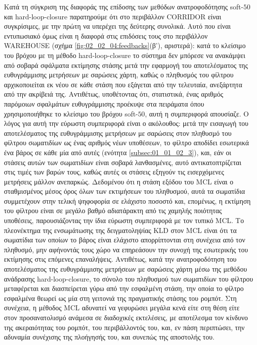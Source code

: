 Κατά τη σύγκριση της διαφοράς της επίδοσης των μεθόδων ανατροφοδότησης
soft-$50$ και hard-loop-closure παρατηρούμε ότι στο περιβάλλον CORRIDOR είναι
συγκρίσιμες, με την πρώτη να υπερέχει της δεύτερης συνολικά. Αυτό που είναι
εντυπωσιακό όμως είναι η διαφορά στις επιδόσεις τους στο περιβάλλον WAREHOUSE
(σχήμα \ref{fig:02_02_04:feedbacks}(β'), αριστερά): κατά το κλείσιμο του βρόχου
με τη μέθοδο hard-loop-closure το σύστημα δεν μπόρεσε να ανακάμψει από σοβαρά
σφάλματα εκτίμησης στάσης μετά την εφαρμογή του αποτελέσματος της ευθυγράμμισης
μετρήσεων με σαρώσεις χάρτη, καθώς ο πληθυσμός του φίλτρου αρχικοποιείται εκ
νέου σε κάθε στάση που εξάγεται από την τελευταία, ανεξάρτητα από την ακρίβειά
της. Αντιθέτως, υποθέτοντας ότι, στατιστικά, ένας αριθμός παρόμοιων σφαλμάτων
ευθυγράμμισης προέκυψε στα πειράματα όπου χρησιμοποιήθηκε το κλείσιμο του
βρόχου soft-$50$, αυτή η συμπεριφορά απουσίαζε. Ο λόγος για αυτή την εύρωστη
συμπεριφορά είναι ο ακόλουθος: μετά την εισαγωγή του αποτελέσματος της
ευθυγράμμισης μετρήσεων με σαρώσεις στον πληθυσμό του φίλτρου σωματιδίων ως
ένας αριθμός νέων υποθέσεων, το φίλτρο αποδίδει εσωτερικά ένα βάρος σε κάθε μία
από αυτές (ενότητα \ref{subsec:01_01_02_3}), και, εάν οι στάσεις αυτών των
σωματιδίων είναι σοβαρά λανθασμένες, αυτό αντικατοπτρίζεται στις τιμές των
βαρών τους, καθώς αυτές οι στάσεις εξηγούν τις εισερχόμενες μετρήσεις μάλλον
ανεπαρκώς. Δεδομένου ότι η στάση εξόδου του MCL είναι ο σταθμισμένος μέσος όρος
όλων των εκτιμήσεων του πληθυσμού, αυτά τα σωματίδια συμμετέχουν στην τελική
ψηφοφορία σε ελάχιστο ποσοστό και, επομένως, η εκτίμηση του φίλτρου είναι σε
μεγάλο βαθμό αδιατάρακτη από τις χαμηλής ποιότητας υποθέσεις, παρουσιάζοντας
την ίδια εύρωστη συμπεριφορά με τον τυπικό MCL. Το πλεονέκτημα της ενσωμάτωσης
της δειγματοληψίας KLD στον MCL είναι ότι τα σωματίδια των οποίων το βάρος
είναι ελάχιστο απορρίπτονται στη συνέχεια από τον πληθυσμό, μην αφήνοντάς τους
χώρο να επηρεάσουν την συνοχή της εσωτερικής του εκτίμησης στις επόμενες
επαναλήψεις. Αντιθέτως, κατά την ανατροφοδότηση του αποτελέσματος της
ευθυγράμμισης μετρήσεων με σαρώσεις χάρτη μέσω της μεθόδου ανάδρασης
hard-loop-closure, το σύνολο του πληθυσμού των σωματιδίων του φίλτρου
μεταφέρεται και διασπείρεται γύρω από την εσφαλμένη στάση, την οποία το φίλτρο
εσφαλμένα θεωρεί ως μία στη γειτονιά της πραγματικής στάσης του ρομπότ.  Στη
συνέχεια, η μέθοδος MCL αδυνατεί να γεφυρώσει μεγάλα κενά είτε στη θέση είτε
στον προσανατολισμό ανάμεσα σε διαδοχικές εκτελέσεις, με αποτέλεσμα τον κίνδυνο
της ακεραιότητας του ρομπότ, του περιβάλλοντός του, και, εν πάση περιπτώσει,
την αδυναμία συνέχισης της πλοήγησής του, και συνεπώς της αποστολής του.
